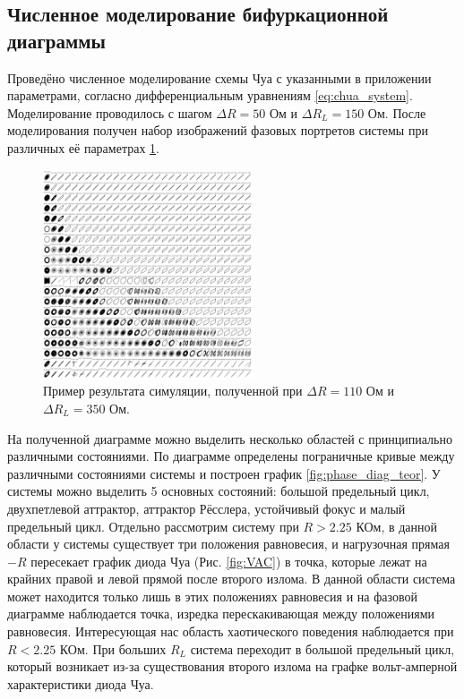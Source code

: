 \documentclass[12pt]{article}
\begin{document}
\subsection*{Численное моделирование бифуркационной диаграммы}
Проведёно численное моделирование схемы Чуа с указанными в приложении параметрами, согласно дифференциальным уравнениям \ref{eq:chua_system}.
Моделирование проводилось с шагом $\Delta R = 50$ Ом и $\Delta R_L = 150$ Ом. После моделирования получен набор
изображений фазовых портретов системы при различных её параметрах \ref{fig:simulation}.
\begin{figure}[H]
	\centering
	\includegraphics[width=0.55\textwidth]{sim_ex.png}
	\caption{Пример результата симуляции, полученной при $\Delta R = 110$ Ом и $\Delta R_L = 350$ Ом.}
	\label{fig:simulation}
\end{figure}
На полученной диаграмме можно выделить несколько областей с принципиально различными состояниями.
По диаграмме определены пограничные кривые между различными состояниями системы и построен график \ref{fig:phase_diag_teor}.
У системы можно выделить 5 основных состояний: большой предельный цикл, двухпетлевой аттрактор, аттрактор Рёсслера, устойчивый фокус и
малый предельный цикл.
Отдельно рассмотрим систему при $R > 2.25$ КОм, в данной области у системы существует три положения равновесия, и нагрузочная
прямая $-R$ пересекает график диода Чуа (Рис. \ref{fig:VAC}) в точка, которые лежат на крайних правой и левой прямой после второго излома.
В данной области система может находится только лишь в этих положениях равновесия и на фазовой диаграмме наблюдается точка, изредка
перескакивающая между положениями равновесия.
Интересующая нас область хаотического поведения наблюдается при $R < 2.25$ КОм. При больших $R_L$ система переходит
в большой предельный цикл, который возникает из-за существования второго излома на графке вольт-амперной характеристики диода Чуа.
\end{document}
